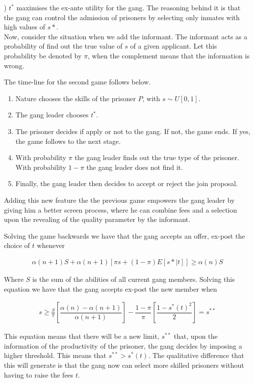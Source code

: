 ) $t^*$ maximises the ex-ante utility for the gang. The reasoning behind it is that the gang can control the admission of prisoners by selecting only inmates with high values of $s*$.\\

Now, consider the situation when we add the informant. The informant acts as a probability of find out the true value of $s$ of a given applicant. Let this probability be denoted by $\pi$, when the complement means that the information is wrong.

The time-line for the second game follows below.

\begin{enumerate}
\item Nature chooses the skills of the prisoner $P$, with $s \sim U[0,1]$.
\item The gang leader chooses $t^*$.
\item The prisoner decides if apply or not to the gang. If not, the game ends. If yes, the game follows to the next stage.
\item With probability $\pi$ the gang leader finds out the true type of the prisoner. With probability $1-\pi$ the gang leader does not find it.
\item Finally, the gang leader then decides to accept or reject the join proposal.
\end{enumerate}

Adding this new feature the the previous game empowers the gang leader by giving him a better screen process, where he can combine fees and a selection upon the revealing of the quality parameter by the informant.

Solving the game backwards we have that the gang accepts an offer, ex-post the choice of $t$ whenever

\begin{align}
\alpha (n+1)S + \alpha (n+1) \left[\pi s + (1-\pi) E[s*|t] \right] \geq \alpha (n)S
\end{align}

Where $S$ is the sum of the abilities of all current gang members. Solving this equation we have that the gang accepts ex-post the new member when

\begin{align}
s \geq \frac{S}{\pi} \left[\dfrac{\alpha(n)-\alpha(n+1)}{\alpha(n+1)}\right] - \dfrac{1-\pi}{\pi}\left[\dfrac{1-s^*(t)^2}{2}\right] = s^{**}
\end{align}

This equation means that there will be a new limit, $s^{**}$ that, upon the information of the productivity of the prisoner, the gang decides by imposing a higher threshold. This means that $s^{**} > s^*(t)$. The qualitative difference that this will generate is that the gang now can select more skilled prisoners without having to raise the fees $t$. 

